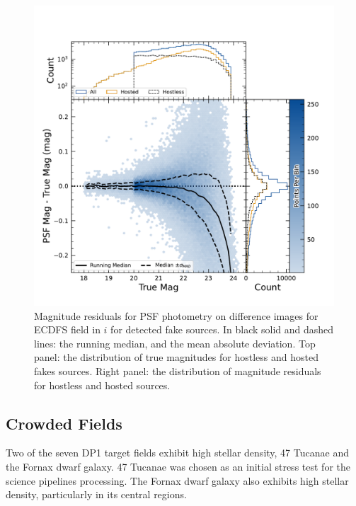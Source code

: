 \begin{figure}
    \centering
    \includegraphics[width=\linewidth]{figures/hexbin_psf_mag.pdf}
    \caption{Magnitude residuals for \gls{PSF} photometry on difference images for ECDFS field in $i$ for detected fake sources. In black solid and dashed lines: the running median, and the mean absolute deviation. Top panel: the distribution of true magnitudes for hostless and hosted fakes sources. Right panel: the distribution of magnitude residuals for hostless and hosted sources.}
    \label{fig:phot_residual_diffim_fakes}
\end{figure}

\subsection{Crowded Fields}
Two of the seven \gls{DP1} target fields exhibit high stellar density, 47 Tucanae and the Fornax dwarf galaxy.
47 Tucanae was chosen as an initial stress test for the science pipelines processing.
The Fornax dwarf galaxy also exhibits high stellar density, particularly in its central regions.
